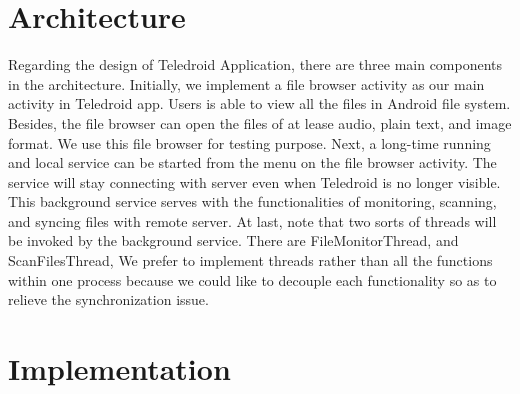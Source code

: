 \section{Architecture}
\label{sec:Architecture}
Regarding the design of Teledroid Application, there are three main components in the architecture. Initially, we implement a file browser activity as our main activity in Teledroid app. Users is able to view all the files in Android file system. Besides, the file browser can open the files of at lease audio, plain text, and image format. We use this file browser for testing purpose. Next, a long-time running and local service can be started from the menu on the file browser activity. The service will stay connecting with server even when Teledroid is no longer visible. This background service serves with the functionalities of monitoring, scanning, and syncing files with remote server. At last, note that two sorts of threads will be invoked by the background service. There are FileMonitorThread, and ScanFilesThread, We prefer to implement threads rather than all the functions within one process because we could like to decouple each functionality so as to relieve the synchronization issue.

\section{Implementation}
\label{sec:Implementation}

